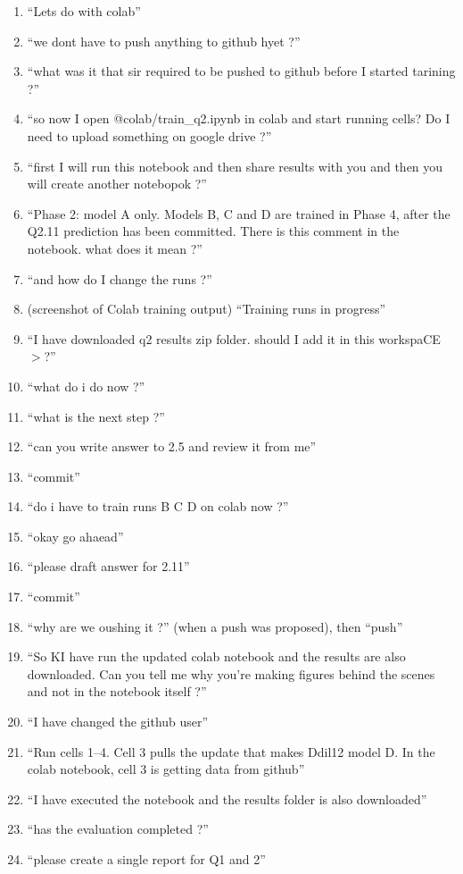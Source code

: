 \documentclass[11pt,a4paper]{article}
\begin{document}
{\begin{enumerate}[leftmargin=*,itemsep=0pt]
  \item ``Lets do with colab''
  \item ``we dont have to push anything to github hyet ?''
  \item ``what was it that sir required to be pushed to github before I started tarining ?''
  \item ``so now I open @colab/train\_q2.ipynb in colab and start running cells? Do I need to upload something on google drive ?''
  \item ``first I will run this notebook and then share results with you and then you will create another notebopok ?''
  \item ``Phase 2: model A only. Models B, C and D are trained in Phase 4, after the Q2.11 prediction has been committed. There is this comment in the notebook. what does it mean ?''
  \item ``and how do I change the runs ?''
  \item (screenshot of Colab training output) ``Training runs in progress''
  \item ``I have downloaded q2 results zip folder. should I add it in this workspaCE $>$?''
  \item ``what do i do now ?''
  \item ``what is the next step ?''
  \item ``can you write answer to 2.5 and review it from me''
  \item ``commit''
  \item ``do i have to train runs B C D on colab now ?''
  \item ``okay go ahaead''
  \item ``please draft answer for 2.11''
  \item ``commit''
  \item ``why are we oushing it ?'' (when a push was proposed), then ``push''
  \item ``So KI have run the updated colab notebook and the results are also downloaded. Can you tell me why you're making figures behind the scenes and not in the notebook itself ?''
  \item ``I have changed the github user''
  \item ``Run cells 1--4. Cell 3 pulls the update that makes Ddil12 model D. In the colab notebook, cell 3 is getting data from github''
  \item ``I have executed the notebook and the results folder is also downloaded''
  \item ``has the evaluation completed ?''
  \item ``please create a single report for Q1 and 2''
\end{enumerate}
}
\end{document}
